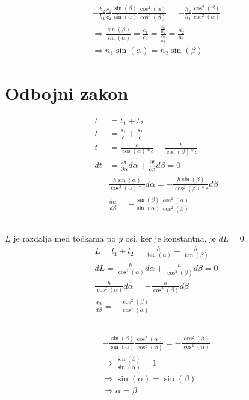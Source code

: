\documentclass[a4paper,12pt]{article}
\begin{document}
\subsection{}
\begin{align}
    -\frac{h_2}{h_1} \frac{c_1}{c_2} \frac{\sin(\beta)}{\sin(\alpha)} \frac{\cos^2(\alpha)}{\cos^2(\beta)} = - \frac{h_2}{h_1} \frac{\cos^2(\beta)}{\cos^2(\alpha)} \\
    \Rightarrow \frac{\sin(\beta)}{\sin(\alpha)} = \frac{c_1}{c_2} = \frac{\frac{c_0}{n_1}}{\frac{c_0}{n_2}} = \frac{n_2}{n_1} \\
    \Rightarrow n_1 \sin(\alpha) = n_2 \sin(\beta)
\end{align}

\newpage
\section{Odbojni zakon}
\begin{align}
    t &= t_1 + t_2 \\
    t &= \frac{s_1}{c} + \frac{s_2}{c} \\
    t &= \frac{h}{\cos(\alpha) * c} + \frac{h}{\cos(\beta) * c} \\
    dt &= \frac{\partial t}{\partial \alpha} d\alpha + \frac{\partial t}{\partial \beta} d\beta = 0 \\
    &\frac{h \sin(\alpha)}{\cos^2(\alpha) * c} d\alpha = -\frac{h \sin(\beta)}{\cos^2(\beta) * c} d\beta \\
    &\frac{d \alpha}{d \beta} = -\frac{\sin(\beta)}{\sin(\alpha)} \frac{\cos^2(\alpha)}{\cos^2(\beta)}
\end{align}

\subsection{}
$L$ je razdalja med točkama po $y$ osi, ker je konstantna, je $dL = 0$
\begin{align}
    L = l_1 + l_2 = \frac{h}{\tan(\alpha)} + \frac{h}{\tan(\beta)} \\
    dL = \frac{h}{\cos^2(\alpha)} d\alpha + \frac{h}{\cos^2(\beta)} d\beta = 0 \\
    \frac{h}{\cos^2(\alpha)} d\alpha = -\frac{h}{\cos^2(\beta)} d\beta \\
    \frac{d \alpha}{d \beta} = -\frac{\cos^2(\beta)}{\cos^2(\alpha)}
\end{align}

\subsection{}
\begin{align}
    -\frac{\sin(\beta)}{\sin(\alpha)} \frac{\cos^2(\alpha)}{\cos^2(\beta)}= -\frac{\cos^2(\beta)}{\cos^2(\alpha)} \\
    \Rightarrow \frac{\sin(\beta)}{\sin(\alpha)} = 1 \\
    \Rightarrow \sin(\alpha) = \sin(\beta)  \\
    \Rightarrow \alpha = \beta
\end{align}
\end{document}
